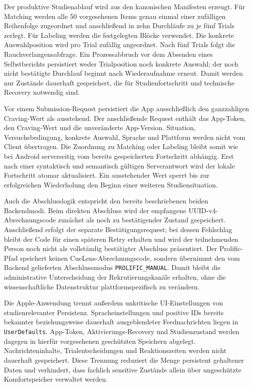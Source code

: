 \begin{neu}
Der produktive Studienablauf wird aus den kanonischen Manifesten erzeugt. Für Matching werden alle 50 vorgesehenen Items genau einmal einer zufälligen Reihenfolge zugeordnet und anschließend in zehn Durchläufe zu je fünf Trials zerlegt. Für Labeling werden die festgelegten Blöcke verwendet. Die konkrete Auswahlposition wird pro Trial zufällig angeordnet. Nach fünf Trials folgt die Rauchverlangensabfrage. Ein Prozessabbruch vor dem Absenden eines Selbstberichts persistiert weder Trialposition noch konkrete Auswahl; der noch nicht bestätigte Durchlauf beginnt nach Wiederaufnahme erneut. Damit werden nur Zustände dauerhaft gespeichert, die für Studienfortschritt und technische Recovery notwendig sind.

Vor einem Submission-Request persistiert die App ausschließlich den ganzzahligen Craving-Wert als ausstehend. Der anschließende Request enthält das App-Token, den Craving-Wert und die unveränderte App-Version. Situation, Versuchsbedingung, konkrete Auswahl, Sprache und Plattform werden nicht vom Client übertragen. Die Zuordnung zu Matching oder Labeling bleibt somit wie bei Android serverseitig vom bereits gespeicherten Fortschritt abhängig. Erst nach einer syntaktisch und semantisch gültigen Serverantwort wird der lokale Fortschritt atomar aktualisiert. Ein ausstehender Wert sperrt bis zur erfolgreichen Wiederholung den Beginn einer weiteren Studiensituation.

Auch die Abschlusslogik entspricht den bereits beschriebenen beiden Backendmodi. Beim direkten Abschluss wird der empfangene UUID-v4-Abrechnungscode zunächst als noch zu bestätigender Zustand gespeichert. Anschließend erfolgt der separate Bestätigungsrequest; bei dessen Fehlschlag bleibt der Code für einen späteren Retry erhalten und wird der teilnehmenden Person noch nicht als vollständig bestätigter Abschluss präsentiert. Der Prolific-Pfad speichert keinen CueLens-Abrechnungscode, sondern übernimmt den vom Backend gelieferten Abschlussmodus \texttt{PROLIFIC\_MANUAL}. Damit bleibt die administrative Unterscheidung der Rekrutierungskanäle erhalten, ohne die wissenschaftliche Datenstruktur plattformspezifisch zu verändern.

Die Apple-Anwendung trennt außerdem unkritische UI-Einstellungen von studienrelevanter Persistenz. Spracheinstellungen und positive IDs bereits bekannter beziehungsweise dauerhaft ausgeblendeter Feednachrichten liegen in \texttt{UserDefaults}. App-Token, Aktivierungs-Recovery und Studienzustand werden dagegen in hierfür vorgesehenen geschützten Speichern abgelegt. Nachrichteninhalte, Trialentscheidungen und Reaktionszeiten werden nicht dauerhaft gespeichert. Diese Trennung reduziert die Menge persistent gehaltener Daten und verhindert, dass fachlich sensitive Zustände allein über ungeschützte Komfortspeicher verwaltet werden.


\end{neu}
